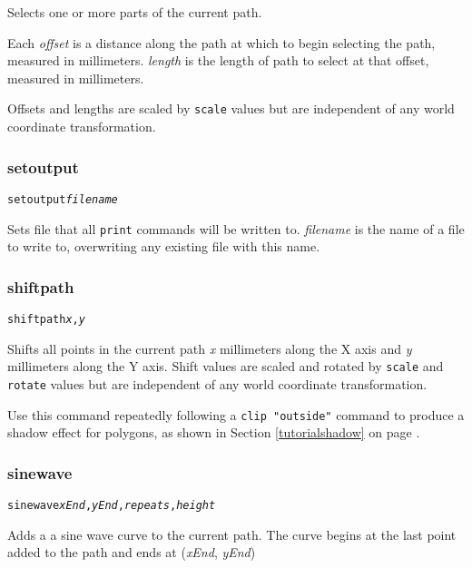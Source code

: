 Selects one or more parts of the current path.

Each \textit{offset} is a distance along the path at which to begin selecting
the path, measured in millimeters.
\textit{length} is the length of path to select at that offset, measured
in millimeters.

Offsets and lengths are scaled by \texttt{scale} values but are independent of
any world coordinate transformation.

\subsubsection{setoutput}

\begin{alltt}
setoutput \textit{filename}
\end{alltt}

Sets file that all \texttt{print} commands will be written to.
\textit{filename} is the name of a file to write to, overwriting any
existing file with this name.

\subsubsection{shiftpath}

\begin{alltt}
shiftpath \textit{x}, \textit{y}
\end{alltt}

Shifts all points in the current path \textit{x} millimeters along the X axis
and \textit{y} millimeters along the Y axis.  Shift values are scaled and
rotated by \texttt{scale} and \texttt{rotate} values but are independent
of any world coordinate transformation.

Use this command
repeatedly following a \texttt{clip "outside"} command to produce a shadow
effect for polygons, as shown in 
Section \ref{tutorialshadow} on page \pageref{tutorialshadow}.

\subsubsection{sinewave}

\begin{alltt}
sinewave \textit{xEnd}, \textit{yEnd}, \textit{repeats}, \textit{height}
\end{alltt}

Adds a a sine wave curve to the current path.  The curve begins at
the last point added to the path and ends at (\textit{xEnd}, \textit{yEnd})

